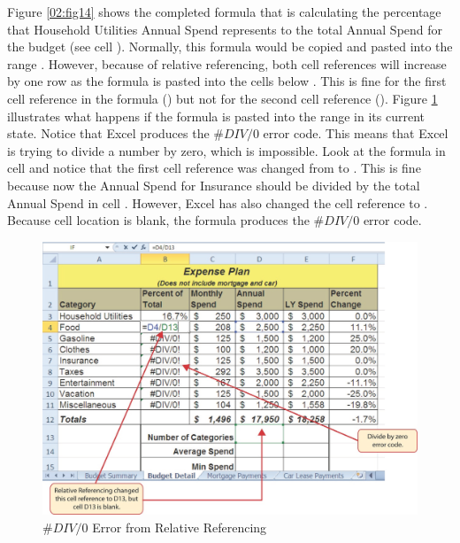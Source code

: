 Figure \ref{02:fig14} shows the completed formula that is calculating the percentage that Household Utilities Annual Spend represents to the total Annual Spend for the budget (see cell ). Normally, this formula would be copied and pasted into the range . However, because of relative referencing, both cell references will increase by one row as the formula is pasted into the cells below . This is fine for the first cell reference in the formula () but not for the second cell reference (). Figure \ref{02:fig15} illustrates what happens if the formula is pasted into the range  in its current state. Notice that Excel produces the $ \#DIV/0 $ error code. This means that Excel is trying to divide a number by zero, which is impossible. Look at the formula in cell  and notice that the first cell reference was changed from  to . This is fine because now the Annual Spend for Insurance should be divided by the total Annual Spend in cell . However, Excel has also changed the  cell reference to . Because cell location  is blank, the formula produces the $ \#DIV/0 $ error code.

\begin{figure}[H]
	\centering
	\includegraphics[width=\maxwidth{.95\linewidth}]{gfx/ch02_fig15}
	\caption{$ \#DIV/0 $ Error from Relative Referencing}
	\label{02:fig15}
\end{figure}

